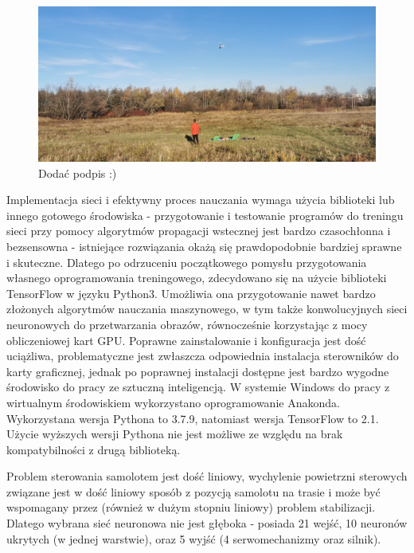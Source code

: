 \documentclass[12pt, a4paper]{article}
\begin{document}
 \begin{figure}[ht]
    \centering
    \includegraphics[width=1\textwidth]{kacperlata}
    \caption{Dodać podpis :)}
\end{figure}

Implementacja sieci i efektywny proces nauczania wymaga użycia biblioteki lub innego gotowego środowiska - przygotowanie i testowanie programów do treningu sieci przy pomocy algorytmów propagacji wstecznej jest bardzo czasochłonna i bezsensowna - istniejące rozwiązania okażą się prawdopodobnie bardziej sprawne i skuteczne. Dlatego po odrzuceniu początkowego pomysłu przygotowania własnego oprogramowania treningowego, zdecydowano się na użycie biblioteki TensorFlow w języku Python3. Umożliwia ona przygotowanie nawet bardzo złożonych algorytmów nauczania maszynowego, w tym także konwolucyjnych sieci neuronowych do przetwarzania obrazów, równocześnie korzystając z mocy obliczeniowej kart GPU. Poprawne zainstalowanie i konfiguracja jest dość uciążliwa, problematyczne jest zwłaszcza odpowiednia instalacja sterowników do karty graficznej, jednak po poprawnej instalacji dostępne jest bardzo wygodne środowisko do pracy ze sztuczną inteligencją. W systemie Windows do pracy z wirtualnym środowiskiem wykorzystano oprogramowanie Anakonda. Wykorzystana wersja Pythona to 3.7.9, natomiast wersja TensorFlow to 2.1. Użycie wyższych wersji Pythona nie jest możliwe ze względu na brak kompatybilności z drugą biblioteką.

Problem sterowania samolotem jest dość liniowy, wychylenie powietrzni sterowych związane jest w dość liniowy sposób z pozycją samolotu na trasie i może być wspomagany przez (również w dużym stopniu liniowy) problem stabilizacji. Dlatego wybrana sieć neuronowa nie jest głęboka - posiada 21 wejść, 10 neuronów ukrytych (w jednej warstwie), oraz 5 wyjść (4 serwomechanizmy oraz silnik).
\end{document}
